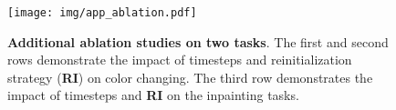\begin{figure}[t]
    \centering
    \texttt{[image: img/app\_ablation.pdf]}
    \caption{\textbf{Additional ablation studies on two tasks}. The first and second rows demonstrate the impact of timesteps and reinitialization strategy (\textbf{RI}) on color changing. The third row demonstrates the impact of timesteps and \textbf{RI} on the inpainting tasks.}
    \label{fig:app_ablation}
    \vspace{-10pt}
\end{figure}
